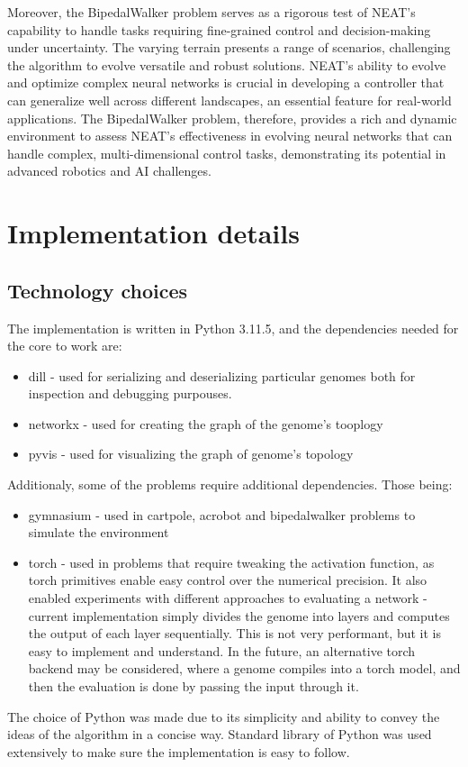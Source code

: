 \documentclass{article}
\begin{document}
        \par Moreover, the BipedalWalker problem serves as a rigorous test of NEAT's capability to handle tasks requiring fine-grained
        control and decision-making under uncertainty. The varying terrain presents a range of scenarios,
        challenging the algorithm to evolve versatile and robust solutions. NEAT's ability to evolve and optimize
        complex neural networks is crucial in developing a controller that can generalize well across different landscapes,
        an essential feature for real-world applications. The BipedalWalker problem, therefore,
        provides a rich and dynamic environment to assess NEAT's effectiveness in evolving neural networks that can handle complex,
        multi-dimensional control tasks, demonstrating its potential in advanced robotics and AI challenges.

    \section{Implementation details}
        \subsection{Technology choices}
        The implementation is written in Python 3.11.5, and the dependencies needed for the core to work are:
        \begin{itemize}
            \item dill - used for serializing and deserializing particular genomes both for inspection and debugging purpouses. 
            \item networkx - used for creating the graph of the genome's tooplogy 
            \item pyvis - used for visualizing the graph of genome's topology
        \end{itemize}
        Additionaly, some of the problems require additional dependencies. Those being:
        \begin{itemize}
            \item gymnasium \cite{gymnasium} - used in cartpole, acrobot and bipedalwalker problems to simulate the environment
            \item torch \cite{Pytorch} - used in problems that require tweaking the activation function, as torch primitives enable easy control over the numerical precision. 
                It also enabled experiments with different approaches to evaluating a network - current implementation simply divides the genome into layers and 
                computes the output of each layer sequentially. This is not very performant, but it is easy to implement and understand. In the future,
                an alternative torch backend may be considered, where a genome compiles into a torch model, and then the evaluation is done by passing the input
                through it.
        \end{itemize}
        The choice of Python was made due to its simplicity and ability to convey the ideas of the algorithm in a concise way.
        Standard library of Python was used extensively to make sure the implementation is easy to follow.
\end{document}
